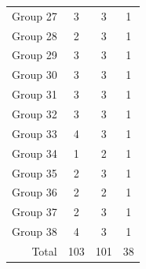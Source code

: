 \begin{table}[t]
\begin{tabular}{@{}rccc@{}}
        Group 27 & 3                                         & 3                                          & 1                                      \\
        Group 28 & 2                                         & 3                                          & 1                                      \\
        Group 29 & 3                                         & 3                                          & 1                                      \\
        Group 30 & 3                                         & 3                                          & 1                                      \\
        Group 31 & 3                                         & 3                                          & 1                                      \\
        Group 32 & 3                                         & 3                                          & 1                                      \\
        Group 33 & 4                                         & 3                                          & 1                                      \\
        Group 34 & 1                                         & 2                                          & 1                                      \\
        Group 35 & 2                                         & 3                                          & 1                                      \\
        Group 36 & 2                                         & 2                                          & 1                                      \\
        Group 37 & 2                                         & 3                                          & 1                                      \\
        Group 38 & 4                                         & 3                                          & 1                                      \\ \midrule
        Total    & 103                                       & 101                                        & 38                                     \\
        \bottomrule
    \end{tabular}
\end{table}


